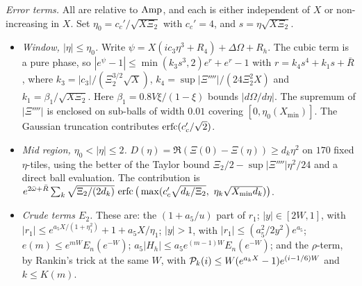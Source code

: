 \emph{Error terms.} All are relative to $\operatorname{Amp}$, and each is either independent of $X$ or non-increasing in $X$. Set
$\eta_0=c_c'/\sqrt{X\Xi_2}$ with $c_c'=4$, and $s=\eta\sqrt{X\Xi_2}$.
\begin{itemize}
\item \emph{Window, $|\eta|\le\eta_0$.} Write $\psi=X(ic_3\eta^3+R_4)+\Delta\Omega+R_h$. The cubic term is a pure phase, so
$|e^\psi-1|\le\min(k_3s^3,2)e^r+e^r-1$ with $r=k_4s^4+k_1s+\bar R$, where $k_3=|c_3|/(\Xi_2^{3/2}\sqrt X)$,
$k_4=\sup|\Xi''''|/(24\Xi_2^2X)$ and $k_1=\beta_1/\sqrt{X\Xi_2}$. Here $\beta_1=0.8V\xi/(1-\xi)$ bounds $|d\Omega/d\eta|$.
The supremum of $|\Xi''''|$ is enclosed on sub-balls of width $0.01$ covering $[0,\eta_0(X_{\min})]$. The Gaussian
truncation contributes $\operatorname{erfc}(c_c'/\sqrt2)$.
\item \emph{Mid region, $\eta_0<|\eta|\le2$.} $D(\eta)=\Re(\Xi(0)-\Xi(\eta))\ge d_k\eta^2$ on $170$ fixed $\eta$-tiles,
using the better of the Taylor bound $\Xi_2/2-\sup|\Xi''''|\eta^2/24$ and a direct ball evaluation. The contribution is
$e^{2\bar\omega+\bar R}\sum_k\sqrt{\Xi_2/(2d_k)}\,\erfc\big(\max(c_c'\sqrt{d_k/\Xi_2},\ \eta_k\sqrt{X_{\min}d_k})\big)$.
\item \emph{Crude terms $E_2$.} These are: the $(1+a_5/u)$ part of $r_1$; $|y|\in[2W,1]$, with
$|r_1|\le e^{a_5X/(1+\eta_1^2)}+1+a_5X/\eta_1$; $|y|>1$, with $|r_1|\le(a_5^2/2y^2)e^{a_5}$; $e(m)\le e^{mW}E_n(e^{-W})$;
$a_5|H_h|\le a_5e^{(m-1)W}E_n(e^{-W})$; and the $\rho$-term, by Rankin's trick at the same $W$, with
$\mathcal P_k(i)\le W(e^{a_kX}-1)e^{(i-1/6)W}$ and $k\le K(m)$.
\end{itemize}

